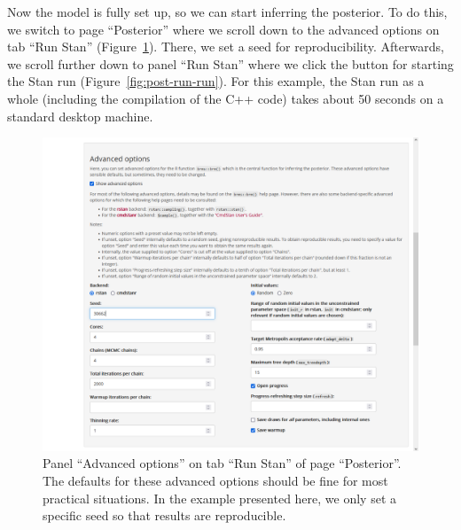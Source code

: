 Now the model is fully set up, so we can start inferring the posterior. To do
this, we switch to page ``Posterior'' where
we scroll down to the advanced options on tab ``Run Stan''
(Figure~\ref{fig:post-run-advOpts}). There, we set a seed for reproducibility.
Afterwards, we scroll further down to panel ``Run Stan'' where we
click the button for starting the Stan run
(Figure~\ref{fig:post-run-run}). For this example, the Stan run as a
whole (including the compilation of the C++ code) takes about 50 seconds
on a standard desktop machine.
\begin{figure}[t!]
  \centering
  \includegraphics[width=\textwidth]{Figures/Posterior_Run_AdvOpts.png}
  \caption[Panel ``Advanced options'']{Panel ``Advanced options'' on
  tab ``Run Stan'' of page ``Posterior''.
  The defaults for these advanced options should be fine for most practical
  situations. In the example presented here, we only set a specific seed so
  that results are reproducible.}
  \label{fig:post-run-advOpts}
\end{figure}%
